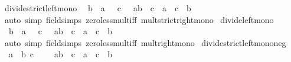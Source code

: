 \begin{isabellebody}
\isamarkupfalse%
\ divide{\isacharunderscore}{\kern0pt}strict{\isacharunderscore}{\kern0pt}left{\isacharunderscore}{\kern0pt}mono{\isacharcolon}{\kern0pt}\isanewline
\ \ {\isachardoublequoteopen}{\isasymlbrakk}b\ {\isacharless}{\kern0pt}\ a{\isacharsemicolon}{\kern0pt}\ {}\ {\isacharless}{\kern0pt}\ c{\isacharsemicolon}{\kern0pt}\ {}\ {\isacharless}{\kern0pt}\ a{\isacharasterisk}{\kern0pt}b{\isasymrbrakk}\ {\isasymLongrightarrow}\ c\ {\isacharslash}{\kern0pt}\ a\ {\isacharless}{\kern0pt}\ c\ {\isacharslash}{\kern0pt}\ b{\isachardoublequoteclose}\isanewline
%
\isadelimproof
\ \ %
\endisadelimproof
%
\isatagproof
{}\isamarkupfalse%
\ {\isacharparenleft}{\kern0pt}auto\ simp{\isacharcolon}{\kern0pt}\ field{\isacharunderscore}{\kern0pt}simps\ zero{\isacharunderscore}{\kern0pt}less{\isacharunderscore}{\kern0pt}mult{\isacharunderscore}{\kern0pt}iff\ mult{\isacharunderscore}{\kern0pt}strict{\isacharunderscore}{\kern0pt}right{\isacharunderscore}{\kern0pt}mono{\isacharparenright}{\kern0pt}%
\endisatagproof
{\isafoldproof}%
%
\isadelimproof
\isanewline
%
\endisadelimproof
\isanewline
{}\isamarkupfalse%
\ divide{\isacharunderscore}{\kern0pt}left{\isacharunderscore}{\kern0pt}mono{\isacharcolon}{\kern0pt}\isanewline
\ \ {\isachardoublequoteopen}{\isasymlbrakk}b\ {\isasymle}\ a{\isacharsemicolon}{\kern0pt}\ {}\ {\isasymle}\ c{\isacharsemicolon}{\kern0pt}\ {}\ {\isacharless}{\kern0pt}\ a{\isacharasterisk}{\kern0pt}b{\isasymrbrakk}\ {\isasymLongrightarrow}\ c\ {\isacharslash}{\kern0pt}\ a\ {\isasymle}\ c\ {\isacharslash}{\kern0pt}\ b{\isachardoublequoteclose}\isanewline
%
\isadelimproof
\ \ %
\endisadelimproof
%
\isatagproof
{}\isamarkupfalse%
\ {\isacharparenleft}{\kern0pt}auto\ simp{\isacharcolon}{\kern0pt}\ field{\isacharunderscore}{\kern0pt}simps\ zero{\isacharunderscore}{\kern0pt}less{\isacharunderscore}{\kern0pt}mult{\isacharunderscore}{\kern0pt}iff\ mult{\isacharunderscore}{\kern0pt}right{\isacharunderscore}{\kern0pt}mono{\isacharparenright}{\kern0pt}%
\endisatagproof
{\isafoldproof}%
%
\isadelimproof
\isanewline
%
\endisadelimproof
\isanewline
{}\isamarkupfalse%
\ divide{\isacharunderscore}{\kern0pt}strict{\isacharunderscore}{\kern0pt}left{\isacharunderscore}{\kern0pt}mono{\isacharunderscore}{\kern0pt}neg{\isacharcolon}{\kern0pt}\isanewline
\ \ {\isachardoublequoteopen}{\isasymlbrakk}a\ {\isacharless}{\kern0pt}\ b{\isacharsemicolon}{\kern0pt}\ c\ {\isacharless}{\kern0pt}\ {}{\isacharsemicolon}{\kern0pt}\ {}\ {\isacharless}{\kern0pt}\ a{\isacharasterisk}{\kern0pt}b{\isasymrbrakk}\ {\isasymLongrightarrow}\ c\ {\isacharslash}{\kern0pt}\ a\ {\isacharless}{\kern0pt}\ c\ {\isacharslash}{\kern0pt}\ b{\isachardoublequoteclose}\isanewline

\end{isabellebody}
